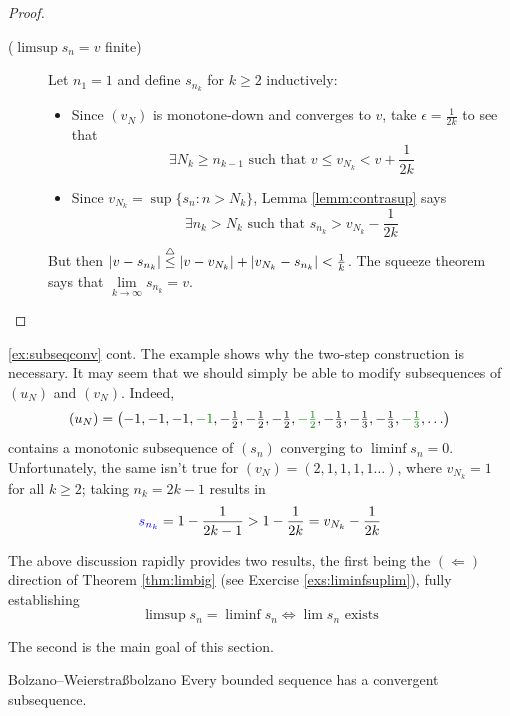 \begin{proof}
\begin{description}
	  \item[\normalfont ($\limsup s_n=v$ finite)]\lstsp Let $n_1=1$ and define $s_{n_k}$ for $k\ge 2$ inductively:
		\begin{itemize}
		  \item Since $(v_N)$ is monotone-down and converges to $v$, take $\epsilon=\frac 1{2k}$ to see that\footnotemark{}
		  \[\exists N_k\ge n_{k-1}\text{ such that }v\le v_{N_k}<v+\frac 1{2k}\]
	
		  \item Since $v_{N_k}=\sup\{s_n:n>N_k\}$, Lemma \ref{lemm:contrasup} says
		  \[
		  	\exists n_k>N_k\text{ such that }s_{n_k}>v_{N_k}-\frac 1{2k}
		  \]
		\end{itemize}
		But then $\left| v-s_{n_k}\right|\overset{\smash{\triangle}}{\le}\left| v-v_{N_k}\right|+\left| v_{N_k}-s_{n_k}\right|<\frac 1k$. The squeeze theorem says that $\lim\limits_{k\to\infty}s_{n_k}=v$.\hfill\qedhere
	\end{description}
\end{proof}



\goodbreak


\begin{example*}{\ref{ex:subseqconv} cont.}{}
	The example shows why the two-step construction is necessary. It may seem that we should simply be able to modify subsequences of $(u_N)$ and $(v_N)$. Indeed,
	\[(u_N)=\bigl(-1,-1,-1,\textcolor{Green}{-1}, -\tfrac 12,-\tfrac 12,-\tfrac 12,\textcolor{Green}{-\tfrac 12}, -\tfrac 13,-\tfrac 13,-\tfrac 13,\textcolor{Green}{-\tfrac 13},\ldots\bigr)\]
	contains a monotonic subsequence of $(s_n)$ converging to $\liminf s_n=0$. Unfortunately, the same isn't true for $(v_N)=(2,1,1,1,1\ldots)$, where $v_{N_k}=1$ for all $k\ge 2$; taking $n_k=2k-1$ results in
	\[
		\textcolor{blue}{s_{n_k}}=1-\frac 1{2k-1}>1-\frac 1{2k} =v_{N_k}-\frac 1{2k}
	\]
\end{example*}


The above discussion rapidly provides two results, the first being the $(\Leftarrow)$ direction of Theorem \ref{thm:limbig} (see Exercise \ref{exs:liminfsuplim}), fully establishing
\[
	\limsup s_n=\liminf s_n \iff \lim s_n\text{ exists} \tag{could be $\pm\infty$}
\]


The second is the main goal of this section.

\begin{thm}{Bolzano--Weierstraß}{bolzano}
	Every bounded sequence has a convergent subsequence.
\end{thm}


